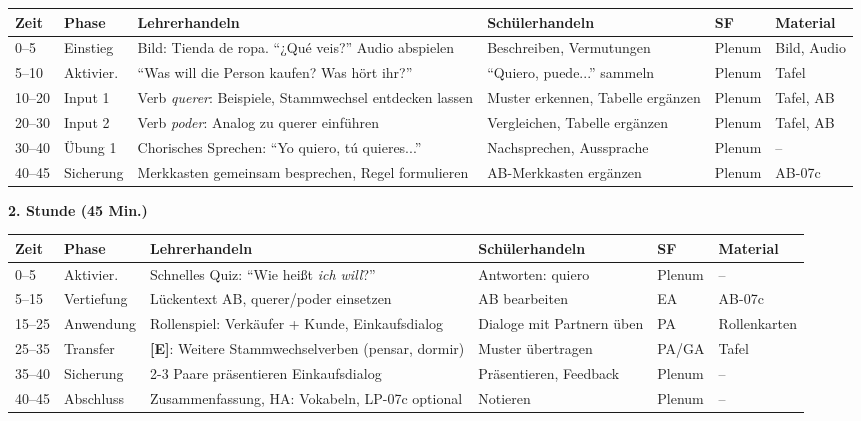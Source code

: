 \documentclass[11pt,a4paper]{article}
\newcommand{\E}{\textcolor{erweiterung}{\textbf{[E]}}}
\begin{document}
\begin{longtable}{|p{1cm}|p{1.5cm}|p{4cm}|p{3cm}|p{1.5cm}|p{2cm}|}
\hline
\textbf{Zeit} & \textbf{Phase} & \textbf{Lehrerhandeln} & \textbf{Schülerhandeln} & \textbf{SF} & \textbf{Material} \\
\hline
\endhead

0--5 & Einstieg & Bild: Tienda de ropa. ``¿Qué veis?'' Audio abspielen & Beschreiben, Vermutungen & Plenum & Bild, Audio \\
\hline

5--10 & Aktivier. & ``Was will die Person kaufen? Was hört ihr?'' & ``Quiero, puede...'' sammeln & Plenum & Tafel \\
\hline

10--20 & Input 1 & Verb \textit{querer}: Beispiele, Stammwechsel entdecken lassen & Muster erkennen, Tabelle ergänzen & Plenum & Tafel, AB \\
\hline

20--30 & Input 2 & Verb \textit{poder}: Analog zu querer einführen & Vergleichen, Tabelle ergänzen & Plenum & Tafel, AB \\
\hline

30--40 & Übung 1 & Chorisches Sprechen: ``Yo quiero, tú quieres...'' & Nachsprechen, Aussprache & Plenum & -- \\
\hline

40--45 & Sicherung & Merkkasten gemeinsam besprechen, Regel formulieren & AB-Merkkasten ergänzen & Plenum & AB-07c \\
\hline
\end{longtable}

\vspace{1em}

\textbf{2. Stunde (45 Min.)}

\begin{longtable}{|p{1cm}|p{1.5cm}|p{4cm}|p{3cm}|p{1.5cm}|p{2cm}|}
\hline
\textbf{Zeit} & \textbf{Phase} & \textbf{Lehrerhandeln} & \textbf{Schülerhandeln} & \textbf{SF} & \textbf{Material} \\
\hline
\endhead

0--5 & Aktivier. & Schnelles Quiz: ``Wie heißt \textit{ich will}?'' & Antworten: quiero & Plenum & -- \\
\hline

5--15 & Vertiefung & Lückentext AB, querer/poder einsetzen & AB bearbeiten & EA & AB-07c \\
\hline

15--25 & Anwendung & Rollenspiel: Verkäufer + Kunde, Einkaufsdialog & Dialoge mit Partnern üben & PA & Rollenkarten \\
\hline

25--35 & Transfer & \E{}: Weitere Stammwechselverben (pensar, dormir) & Muster übertragen & PA/GA & Tafel \\
\hline

35--40 & Sicherung & 2-3 Paare präsentieren Einkaufsdialog & Präsentieren, Feedback & Plenum & -- \\
\hline

40--45 & Abschluss & Zusammenfassung, HA: Vokabeln, LP-07c optional & Notieren & Plenum & -- \\
\hline
\end{longtable}
\end{document}
